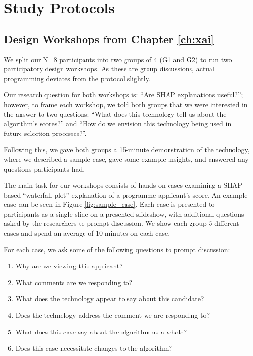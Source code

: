 \chapter{\label{app:protocolmockup}Study Protocols}

\minitoc

\section{Design Workshops from Chapter \ref{ch:xai}}\label{app:xaiprotocol}
We split our N=8 participants into two groups of 4 (G1 and G2) to run two participatory design workshops. As these are group discussions, actual programming deviates from the protocol slightly.

Our research question for both workshops is: ``Are SHAP explanations useful?''; however, to frame each workshop, we told both groups that we were interested in the answer to two questions: ``What does this technology tell us about the algorithm’s scores?'' and ``How do we envision this technology being used in future selection processes?''.

Following this, we gave both groups a 15-minute demonstration of the technology, where we described a sample case, gave some example insights, and answered any questions participants had. 

The main task for our workshops consists of hands-on cases examining a SHAP-based ``waterfall plot'' explanation of a programme applicant's score. An example case can be seen in Figure \ref{fig:sample_case}. Each case is presented to participants as a single slide on a presented slideshow, with additional questions asked by the researchers to prompt discussion. We show each group 5 different cases and spend an average of 10 minutes on each case.

For each case, we ask some of the following questions to prompt discussion:

\begin{enumerate}
    \item Why are we viewing this applicant?
    \item What comments are we responding to?
    \item What does the technology appear to say about this candidate?
    \item Does the technology address the comment we are responding to?
    \item What does this case say about the algorithm as a whole?
    \item Does this case necessitate changes to the algorithm?
\end{enumerate}

